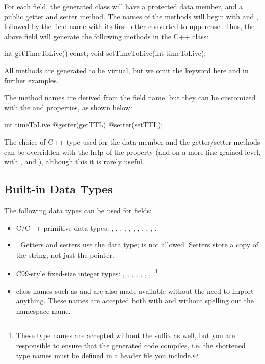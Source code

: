 For each field, the generated class will have a protected data member, and a
public getter and setter method. The names of the methods will begin with
 and , followed by the field name with its first letter
converted to uppercase. Thus, the above field will generate the following
methods in the C++ class:

\begin{cpp}
int getTimeToLive() const;
void setTimeToLive(int timeToLive);
\end{cpp}

\begin{note}
All methods are generated to be virtual, but we omit the 
keyword here and in further examples.
\end{note}

The method names are derived from the field name, but they can be customized
with the  and  properties, as shown below:

\begin{msg}
int timeToLive @getter(getTTL) @setter(setTTL);
\end{msg}

The choice of C++ type used for the data member and the getter/setter methods
can be overridden with the help of the  property (and on a more
fine-grained level, with ,  and
), although this it is rarely useful.


\subsection{Built-in Data Types}
\label{sec:msg-defs:field-data-types}

The following data types can be used for fields:

\begin{itemize}
  \item C/C++ primitive data types: , ,
    , , , ,
    , , , , .
  \item {}. Getters and setters use the  data
    type;  is not allowed. Setters store a copy of the string, not
    just the pointer.
  \item C99-style fixed-size integer types: ,
    , , ,
    , , ,
    .\footnote{These type names are accepted without the
     suffix as well, but you are responsible to ensure that the
    generated code compiles, i.e. the shortened type names must be defined in a
    header file you include.}
  \item {\opp} class names such as  and  are
    also made available without the need to import anything. These names are
    accepted both with and without spelling out the  namespace
    name.
\end{itemize}

